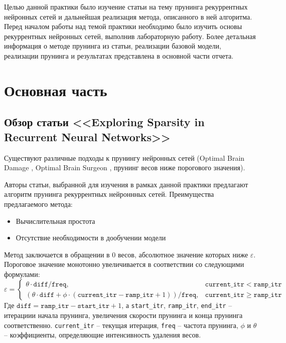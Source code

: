 \documentclass[12pt]{article}
\begin{document}
Целью данной практики было изучение статьи \cite{DBLP:journals/corr/NarangDSE17} на тему прунинга рекуррентных 
нейронных сетей и дальнейшая реализация метода, описанного в ней алгоритма.
Перед началом работы над темой практики необходимо было изучить основы рекуррентных нейронных
сетей, выполнив лабораторную работу. Более детальная информация о 
методе прунинга из статьи, реализации базовой модели, реализации прунинга и результатах представлена 
в основной части отчета. 
\section*{Основная часть}
%

\subsection*{Обзор статьи <<Exploring Sparsity in Recurrent Neural Networks>> \cite{DBLP:journals/corr/NarangDSE17}}
%
Существуют различные подходы к прунингу нейронных сетей (Optimal Brain Damage \cite{Cun:1990:OBD:109230.109298},
Optimal Brain Surgeon \cite{Hassibi}, прунинг весов ниже порогового значения).

Авторы статьи, выбранной для изучения в рамках данной практики предлагают алгоритм прунинга рекуррентных нейроннных сетей.
Преимущества предлагаемого метода:
\begin{itemize}
  \item Вычислительная простота
  \item Отсутствие необходимости в дообучении модели
\end{itemize}
Метод заключается в обращении в $0$ весов, абсолютное значение которых ниже $\varepsilon$. Пороговое значение монотонно 
увеличивается в соответствии со следующими формулами:
\begin{equation}
  \varepsilon = \begin{cases}
    \theta \cdot \mathtt{diff} / \mathtt{freq}, & \mathtt{current\_itr} < \mathtt{ramp\_itr} \\
    \left(\theta \cdot \mathtt{diff} + \phi \cdot (\mathtt{current{\_}itr} - \mathtt{ramp\_itr} + 1)\right) / \mathtt{freq}, & \mathtt{current\_itr} \geqslant \mathtt{ramp\_itr}
  \end{cases}
  \label{eq:eps}
\end{equation}
Где $\mathtt{diff} = \mathtt{ramp\_itr} - \mathtt{start\_itr} + 1$, а \texttt{start\_itr}, \texttt{ramp\_itr}, \texttt{end\_itr} -- 
итерациии начала прунинга, увеличения скорости прунинга и конца прунинга соответственно. \texttt{current\_itr} -- текущая итерация, \texttt{freq} -- частота прунинга, $\phi$ и $\theta$ --
коэффициенты, определяющие интенсивность удаления весов. 
\end{document}
